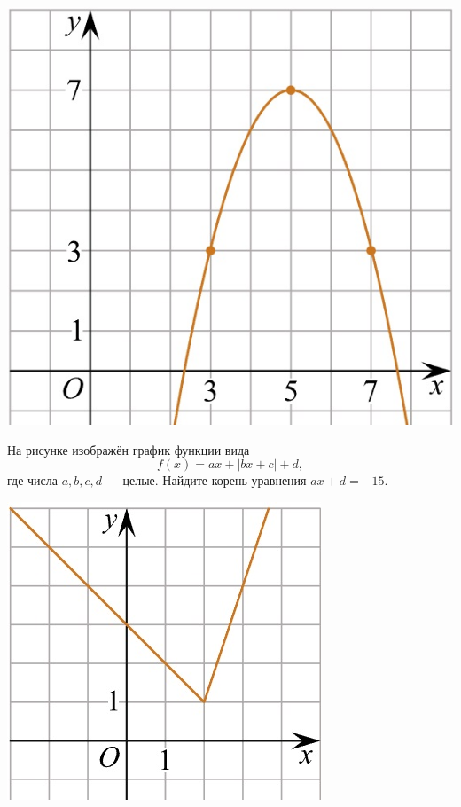 \begin{consultation}
\begin{listofex}
		\begin{minipage}[t]{\picwidth}
			\includegraphics[align=t, width=\linewidth]{../pics/G101M4H2-5.jpg}
		\end{minipage}
		\item
		\begin{minipage}[t]{\bodywidth}
			На рисунке изображён график функции вида \[ f(x)=ax+|bx+c|+d, \] где числа \(a, b, c, d\) --- целые. Найдите корень уравнения \(ax+d=-15\).
		\end{minipage}
		\hspace{0.02\linewidth}
		\begin{minipage}[t]{\picwidth}
			\includegraphics[align=t, width=\linewidth]{../pics/G101M4C5-7.jpg}

\end{minipage}
\end{listofex}
\end{consultation}

